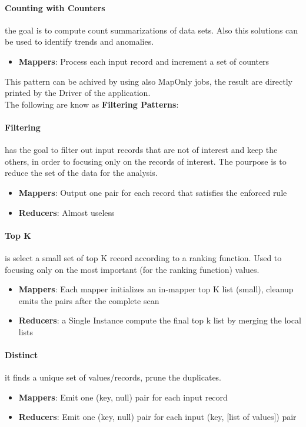 \documentclass[12pt]{article}
\begin{document}
\paragraph{Counting with Counters} the goal is to compute count summarizations of data sets. Also this solutions can be used to identify trends and anomalies.
\begin{itemize}
  \item \textbf{Mappers}: Process each input record and increment a set of counters
\end{itemize}
This pattern can be achived by using also MapOnly jobs, the result are directly printed by the Driver of the application.\\

The following are know as \textbf{Filtering Patterns}:
\paragraph{Filtering} has the goal to filter out input records that are not of interest and keep the others, in order to focusing only on the records of interest. The pourpose is to reduce the set of the data for the analysis.
\begin{itemize}
  \item \textbf{Mappers}: Output one pair for each record that satisfies the enforced rule
  \item \textbf{Reducers}: Almost useless
\end{itemize}

\paragraph{Top K} is select a small set of top K record according to a ranking function. Used to focusing only on the most important (for the ranking function) values.
\begin{itemize}
  \item \textbf{Mappers}: Each mapper initializes an in-mapper top K list (small), cleanup emits the pairs after the complete scan
  \item \textbf{Reducers}: a Single Instance compute the final top k list by merging the local lists
\end{itemize}

\paragraph{Distinct} it finds a unique set of values/records, prune the duplicates.
\begin{itemize}
  \item \textbf{Mappers}: Emit one (key, null) pair for each input record
  \item \textbf{Reducers}: Emit one (key, null) pair for each input (key, [list of values]) pair
\end{itemize}
\end{document}
